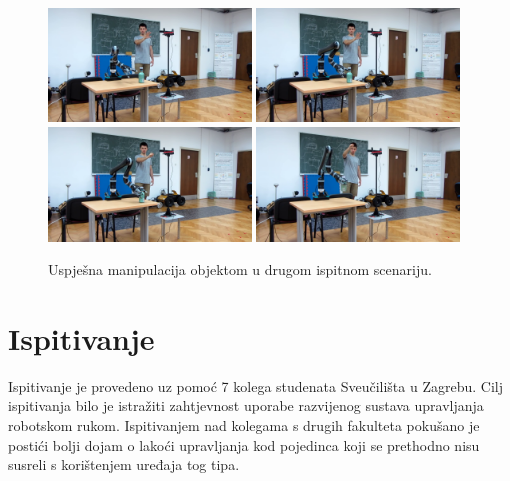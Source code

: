 \documentclass[times, utf8, diplomski, numeric]{fer}
\begin{document}
 \begin{figure}[H]
    \centering
    \includegraphics[width=0.48\textwidth]{video1}
    \includegraphics[width=0.48\textwidth]{video2}
    \includegraphics[width=0.48\textwidth]{video3}
    \includegraphics[width=0.48\textwidth]{video4}
	\caption{Uspješna manipulacija objektom u drugom ispitnom scenariju.}
	\label{fig:successful_grasp_2}
\end{figure}

\section{Ispitivanje}
Ispitivanje je provedeno uz pomoć 7 kolega studenata Sveučilišta u Zagrebu. Cilj ispitivanja bilo je istražiti zahtjevnost uporabe razvijenog sustava upravljanja robotskom rukom. Ispitivanjem nad kolegama s drugih fakulteta pokušano je postići bolji dojam o lakoći upravljanja kod pojedinca koji se prethodno nisu susreli s korištenjem uređaja tog tipa.
\end{document}
